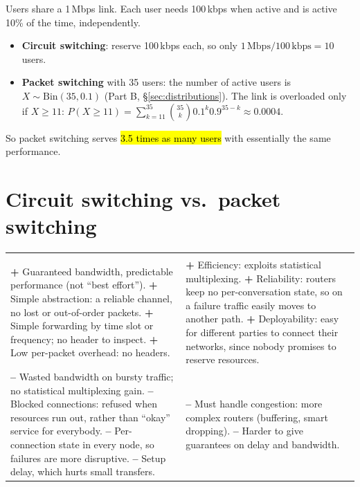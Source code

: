 \begin{example}
Users share a 1\,Mbps link. Each user needs 100\,kbps when active and is active 10\% of the time, independently.
\begin{itemize}
  \item \textbf{Circuit switching}: reserve 100\,kbps each, so only $1\,\text{Mbps}/100\,\text{kbps}=10$ users.
  \item \textbf{Packet switching} with 35 users: the number of active users is $X\sim\text{Bin}(35,0.1)$ (Part B, \S\ref{sec:distributions}).
        The link is overloaded only if $X\ge11$: $P(X\ge11)=\sum_{k=11}^{35}\binom{35}{k}0.1^k0.9^{35-k}\approx0.0004$.
\end{itemize}
So packet switching serves \hl{3.5 times as many users} with essentially the same performance.
\end{example}

\section{Circuit switching vs.\ packet switching}

\begin{center}
\renewcommand{\arraystretch}{1.3}
\begin{tabular}{L{7.2cm} L{7.2cm}}
 & \\
\textbf{+} Guaranteed bandwidth, predictable performance (not ``best effort'').\newline
\textbf{+} Simple abstraction: a reliable channel, no lost or out-of-order packets.\newline
\textbf{+} Simple forwarding by time slot or frequency; no header to inspect.\newline
\textbf{+} Low per-packet overhead: no headers.
&
\textbf{+} Efficiency: exploits statistical multiplexing.\newline
\textbf{+} Reliability: routers keep no per-conversation state, so on a failure traffic easily moves to another path.\newline
\textbf{+} Deployability: easy for different parties to connect their networks, since nobody promises to reserve resources.\\
\textbf{--} Wasted bandwidth on bursty traffic; no statistical multiplexing gain.\newline
\textbf{--} Blocked connections: refused when resources run out, rather than ``okay'' service for everybody.\newline
\textbf{--} Per-connection state in every node, so failures are more disruptive.\newline
\textbf{--} Setup delay, which hurts small transfers.
&
\textbf{--} Must handle congestion: more complex routers (buffering, smart dropping).\newline
\textbf{--} Harder to give guarantees on delay and bandwidth.\\
\end{tabular}
\end{center}

